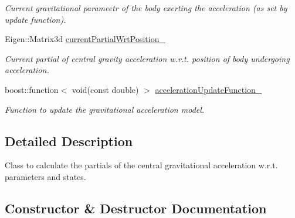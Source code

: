 \begin{DoxyCompactItemize}
\begin{DoxyCompactList}\small\item\em Current gravitational parameetr of the body exerting the acceleration (as set by update function). \end{DoxyCompactList}\item 
Eigen\+::\+Matrix3d \hyperlink{classtudat_1_1acceleration__partials_1_1CentralGravitationPartial_a1a7c7e309400d42b6ed9548e7b39dfa4}{current\+Partial\+Wrt\+Position\+\_\+}
\begin{DoxyCompactList}\small\item\em Current partial of central gravity acceleration w.\+r.\+t. position of body undergoing acceleration. \end{DoxyCompactList}\item 
boost\+::function$<$ void(const double) $>$ \hyperlink{classtudat_1_1acceleration__partials_1_1CentralGravitationPartial_a7d8183d0b1b68807e2f726590276eece}{acceleration\+Update\+Function\+\_\+}\hypertarget{classtudat_1_1acceleration__partials_1_1CentralGravitationPartial_a7d8183d0b1b68807e2f726590276eece}{}\label{classtudat_1_1acceleration__partials_1_1CentralGravitationPartial_a7d8183d0b1b68807e2f726590276eece}

\begin{DoxyCompactList}\small\item\em Function to update the gravitational acceleration model. \end{DoxyCompactList}\end{DoxyCompactItemize}


\subsection{Detailed Description}
Class to calculate the partials of the central gravitational acceleration w.\+r.\+t. parameters and states. 

\subsection{Constructor \& Destructor Documentation}
